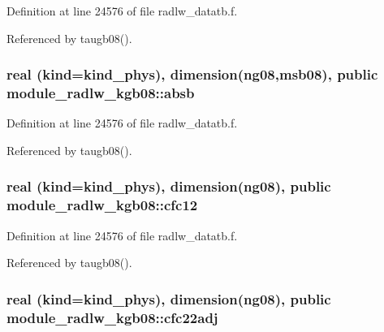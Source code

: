 Definition at line 24576 of file radlw\+\_\+datatb.\+f.



Referenced by taugb08().

\subsubsection[{\texorpdfstring{absb}{absb}}]{\setlength{\rightskip}{0pt plus 5cm}real (kind=kind\+\_\+phys), dimension(ng08,{\bf msb08}), public module\+\_\+radlw\+\_\+kgb08\+::absb}\hypertarget{namespacemodule__radlw__kgb08_a23d4352fcafb0394d723e2f080a84ece}{}\label{namespacemodule__radlw__kgb08_a23d4352fcafb0394d723e2f080a84ece}


Definition at line 24576 of file radlw\+\_\+datatb.\+f.



Referenced by taugb08().

\subsubsection[{\texorpdfstring{cfc12}{cfc12}}]{\setlength{\rightskip}{0pt plus 5cm}real (kind=kind\+\_\+phys), dimension(ng08), public module\+\_\+radlw\+\_\+kgb08\+::cfc12}\hypertarget{namespacemodule__radlw__kgb08_a010239f14788bc1ed9953133e30a62fd}{}\label{namespacemodule__radlw__kgb08_a010239f14788bc1ed9953133e30a62fd}


Definition at line 24576 of file radlw\+\_\+datatb.\+f.



Referenced by taugb08().

\subsubsection[{\texorpdfstring{cfc22adj}{cfc22adj}}]{\setlength{\rightskip}{0pt plus 5cm}real (kind=kind\+\_\+phys), dimension(ng08), public module\+\_\+radlw\+\_\+kgb08\+::cfc22adj}\hypertarget{namespacemodule__radlw__kgb08_a38a3ce7d8f3db6b732511cf78ef735db}{}\label{namespacemodule__radlw__kgb08_a38a3ce7d8f3db6b732511cf78ef735db}


